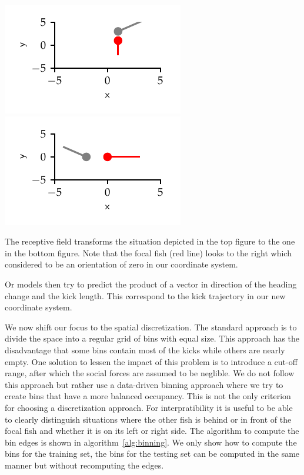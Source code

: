\documentclass[nobib, a4paper]{tufte-handout}
\begin{document}
\begin{marginfigure}
 \includegraphics{receptive_field_before} 
 \includegraphics[scale=1]{receptive_field_after} 
 \caption{The receptive field transforms the situation depicted in the top figure to the one in the bottom figure.
 Note that the focal fish (red line) looks to the right which considered to be an orientation of zero in our coordinate system.}
\label{fig:rf}
\end{marginfigure}

Or models then try to predict the product of a vector in direction of the heading change and the kick length.
This correspond to the kick trajectory in our new coordinate system.

We now shift our focus to the spatial discretization.
The standard approach is to divide the space into a regular grid of bins with equal size.
This approach has the disadvantage that some bins contain most of the kicks while others are nearly empty.
One solution to lessen the impact of this problem is to introduce a cut-off range, after which the social forces are assumed to be neglible.
We do not follow this approach but rather use a data-driven binning approach where we try to create bins that have a more balanced occupancy.
This is not the only criterion for choosing a discretization approach.
For interpratibility it is useful to be able to clearly distinguish situations where the other fish is behind or in front of the focal fish and whether it is on its left or right side.
The algorithm to compute the bin edges is shown in algorithm~\ref{alg:binning}.
We only show how to compute the bins for the training set, the bins for the testing set can be computed in the same manner but without recomputing the edges.
\end{document}
